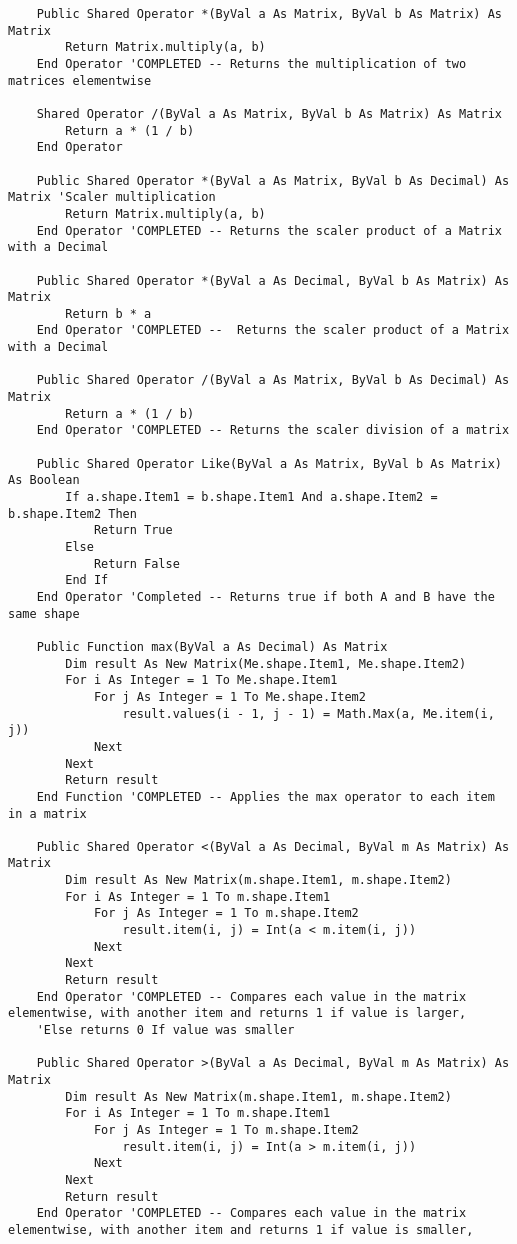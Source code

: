 \begin{verbatim}
    Public Shared Operator *(ByVal a As Matrix, ByVal b As Matrix) As Matrix
        Return Matrix.multiply(a, b)
    End Operator 'COMPLETED -- Returns the multiplication of two matrices elementwise

    Shared Operator /(ByVal a As Matrix, ByVal b As Matrix) As Matrix
        Return a * (1 / b)
    End Operator

    Public Shared Operator *(ByVal a As Matrix, ByVal b As Decimal) As Matrix 'Scaler multiplication
        Return Matrix.multiply(a, b)
    End Operator 'COMPLETED -- Returns the scaler product of a Matrix with a Decimal

    Public Shared Operator *(ByVal a As Decimal, ByVal b As Matrix) As Matrix
        Return b * a
    End Operator 'COMPLETED --  Returns the scaler product of a Matrix with a Decimal

    Public Shared Operator /(ByVal a As Matrix, ByVal b As Decimal) As Matrix
        Return a * (1 / b)
    End Operator 'COMPLETED -- Returns the scaler division of a matrix

    Public Shared Operator Like(ByVal a As Matrix, ByVal b As Matrix) As Boolean
        If a.shape.Item1 = b.shape.Item1 And a.shape.Item2 = b.shape.Item2 Then
            Return True
        Else
            Return False
        End If
    End Operator 'Completed -- Returns true if both A and B have the same shape   

    Public Function max(ByVal a As Decimal) As Matrix
        Dim result As New Matrix(Me.shape.Item1, Me.shape.Item2)
        For i As Integer = 1 To Me.shape.Item1
            For j As Integer = 1 To Me.shape.Item2
                result.values(i - 1, j - 1) = Math.Max(a, Me.item(i, j))
            Next
        Next
        Return result
    End Function 'COMPLETED -- Applies the max operator to each item in a matrix

    Public Shared Operator <(ByVal a As Decimal, ByVal m As Matrix) As Matrix
        Dim result As New Matrix(m.shape.Item1, m.shape.Item2)
        For i As Integer = 1 To m.shape.Item1
            For j As Integer = 1 To m.shape.Item2
                result.item(i, j) = Int(a < m.item(i, j))
            Next
        Next
        Return result
    End Operator 'COMPLETED -- Compares each value in the matrix elementwise, with another item and returns 1 if value is larger, 
    'Else returns 0 If value was smaller

    Public Shared Operator >(ByVal a As Decimal, ByVal m As Matrix) As Matrix
        Dim result As New Matrix(m.shape.Item1, m.shape.Item2)
        For i As Integer = 1 To m.shape.Item1
            For j As Integer = 1 To m.shape.Item2
                result.item(i, j) = Int(a > m.item(i, j))
            Next
        Next
        Return result
    End Operator 'COMPLETED -- Compares each value in the matrix elementwise, with another item and returns 1 if value is smaller, 


\end{verbatim}
